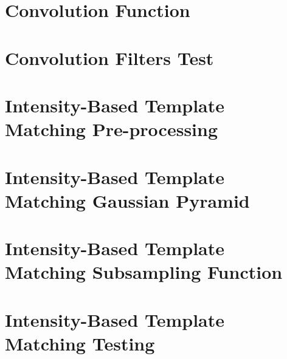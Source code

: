 \documentclass[a4paper,11pt,twocolumn]{article}
\begin{document}

\raggedright



\onecolumn
\clearpage



\clearpage
\begin{appendices}

\section{Convolution Function}


\section{Convolution Filters Test}


\section{Intensity-Based Template Matching Pre-processing}


\clearpage
\section{Intensity-Based Template Matching Gaussian Pyramid}


\section{Intensity-Based Template Matching Subsampling Function}


\clearpage
\section{Intensity-Based Template Matching Testing}



\end{appendices}
\end{document}
